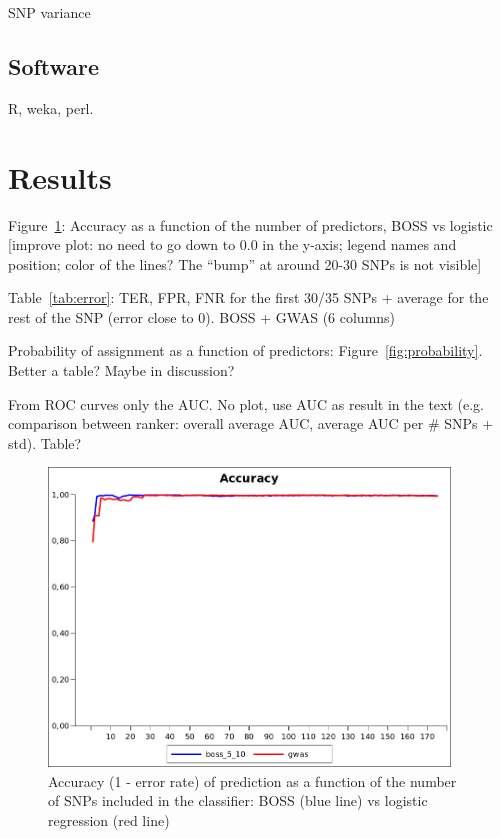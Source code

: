 SNP variance \cite{gianola2009additive}

\subsection{Software}
\label{sec:software}
R, weka, perl.

\section{Results}
\label{sec:results}

Figure~\ref{fig:accuracy}: Accuracy as a function of the number of
predictors, BOSS vs logistic [improve plot: no need to go down to 0.0 in
the y-axis; legend names and position; color of the lines? The ``bump''
at around 20-30 SNPs is not visible]

Table~\ref{tab:error}: TER, FPR, FNR for the first 30/35 SNPs + average for the
rest of the SNP (error close to $0$). BOSS + GWAS (6 columns)


Probability of assignment as a function of predictors:
Figure~\ref{fig:probability}. Better a table? Maybe in discussion?

From ROC curves only the AUC. No plot, use AUC as result in the text (e.g.
comparison between ranker: overall average AUC, average AUC per \# SNPs
+ std). Table?

\begin{figure}
\includegraphics[width=0.95\textwidth]{accuracy.png}
\caption{Accuracy (1 - error rate) of prediction as a function of the
  number of SNPs included in the classifier: BOSS (blue line) vs
  logistic regression (red line)}
\label{fig:accuracy}       %
\end{figure}

